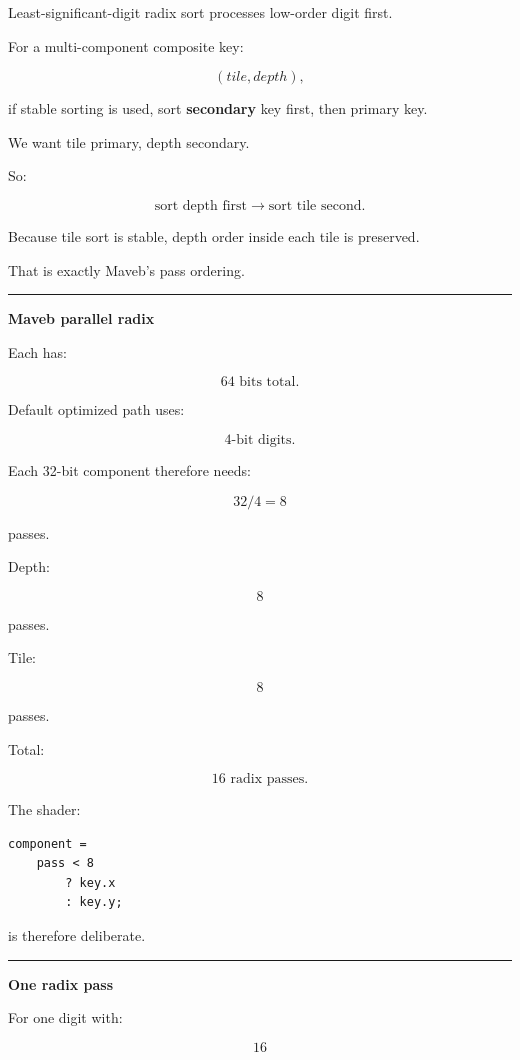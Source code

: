Least-significant-digit radix sort processes low-order digit first.

For a multi-component composite key:

\[
(tile,depth),
\]

if stable sorting is used, sort \textbf{secondary} key first, then primary key.

We want tile primary, depth secondary.

So:

\[
\boxed{
\text{sort depth first}
\rightarrow
\text{sort tile second}.
}
\]

Because tile sort is stable, depth order inside each tile is preserved.

That is exactly Maveb's pass ordering.

\begin{center}\rule{0.5\linewidth}{0.5pt}\end{center}

\textbf{Maveb parallel radix}

Each  has:

\[
64\text{ bits total}.
\]

Default optimized path uses:

\[
4\text{-bit digits}.
\]

Each 32-bit component therefore needs:

\[
32/4=8
\]

passes.

Depth:

\[
8
\]

passes.

Tile:

\[
8
\]

passes.

Total:

\[
\boxed{16\text{ radix passes}.}
\]

The shader:

\begin{verbatim}
component =
    pass < 8
        ? key.x
        : key.y;
\end{verbatim}

is therefore deliberate.

\begin{center}\rule{0.5\linewidth}{0.5pt}\end{center}

\textbf{One radix pass}

For one digit with:

\[
16
\]

